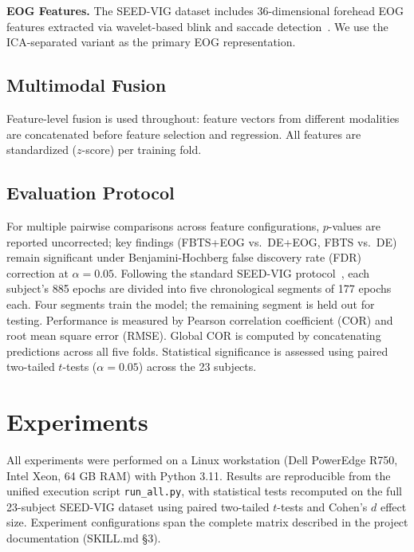 \documentclass{iopjournal}
\begin{document}
\noindent\textbf{EOG Features.} The SEED-VIG dataset includes 36-dimensional forehead EOG features extracted via wavelet-based blink and saccade detection~\cite{zheng2017multimodal}. We use the ICA-separated variant as the primary EOG representation.

\subsection{Multimodal Fusion}

Feature-level fusion is used throughout: feature vectors from different modalities are concatenated before feature selection and regression. All features are standardized ($z$-score) per training fold.

\subsection{Evaluation Protocol}

For multiple pairwise comparisons across feature configurations, $p$-values are reported uncorrected; key findings (FBTS+EOG vs.\ DE+EOG, FBTS vs.\ DE) remain significant under Benjamini-Hochberg false discovery rate (FDR) correction at $\alpha=0.05$. Following the standard SEED-VIG protocol~\cite{zheng2017multimodal}, each subject's 885 epochs are divided into five chronological segments of 177 epochs each. Four segments train the model; the remaining segment is held out for testing. Performance is measured by Pearson correlation coefficient (COR) and root mean square error (RMSE). Global COR is computed by concatenating predictions across all five folds. Statistical significance is assessed using paired two-tailed $t$-tests ($\alpha = 0.05$) across the 23 subjects.

\section{Experiments}
\label{sec:experiments}

All experiments were performed on a Linux workstation (Dell PowerEdge R750, Intel Xeon, 64 GB RAM) with Python 3.11. Results are reproducible from the unified execution script \texttt{run\_all.py}, with statistical tests recomputed on the full 23-subject SEED-VIG dataset using paired two-tailed $t$-tests and Cohen's $d$ effect size. Experiment configurations span the complete matrix described in the project documentation (SKILL.md \S3).
\end{document}
